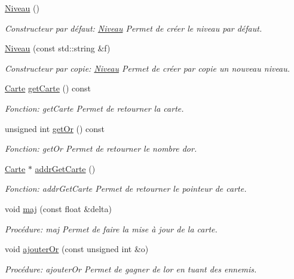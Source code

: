 \begin{DoxyCompactItemize}
\item 
\hyperlink{classNiveau_abf99be59a575d462a25c4ade5c124431}{Niveau} ()
\begin{DoxyCompactList}\small\item\em Constructeur par défaut\+: \hyperlink{classNiveau}{Niveau} Permet de créer le niveau par défaut. \end{DoxyCompactList}\item 
\hyperlink{classNiveau_a5f59a46da066f15b0c21154cbf583490}{Niveau} (const std\+::string \&f)
\begin{DoxyCompactList}\small\item\em Constructeur par copie\+: \hyperlink{classNiveau}{Niveau} Permet de créer par copie un nouveau niveau. \end{DoxyCompactList}\item 
\hyperlink{classCarte}{Carte} \hyperlink{classNiveau_aa73cc05c792c580821b06e21e8eab4b1}{get\+Carte} () const
\begin{DoxyCompactList}\small\item\em Fonction\+: get\+Carte Permet de retourner la carte. \end{DoxyCompactList}\item 
unsigned int \hyperlink{classNiveau_a2ec4d0acee314e00c509b603c580b13b}{get\+Or} () const
\begin{DoxyCompactList}\small\item\em Fonction\+: get\+Or Permet de retourner le nombre d\textquotesingle{}or. \end{DoxyCompactList}\item 
\hyperlink{classCarte}{Carte} $\ast$ \hyperlink{classNiveau_a47ea8b8f36e27be8ad0d3f534a956260}{addr\+Get\+Carte} ()
\begin{DoxyCompactList}\small\item\em Fonction\+: addr\+Get\+Carte Permet de retourner le pointeur de carte. \end{DoxyCompactList}\item 
void \hyperlink{classNiveau_a3d1e0f0ec2d7b72eae985d0448c17dd5}{maj} (const float \&delta)
\begin{DoxyCompactList}\small\item\em Procédure\+: maj Permet de faire la mise à jour de la carte. \end{DoxyCompactList}\item 
void \hyperlink{classNiveau_adf4df9af322f4354ca4a9adeffd5eb29}{ajouter\+Or} (const unsigned int \&o)
\begin{DoxyCompactList}\small\item\em Procédure\+: ajouter\+Or Permet de gagner de l\textquotesingle{}or en tuant des ennemis. \end{DoxyCompactList}\item 

\end{DoxyCompactItemize}
